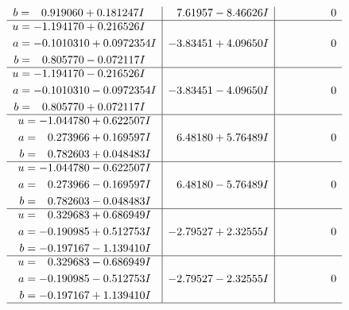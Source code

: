 \documentclass[1p]{elsarticle_modified}
\theoremstyle{definition}
\begin{document}
$$\begin{array}{c|c|c}
\begin{aligned}
b &= \phantom{-}0.919060 + 0.181247 I\end{aligned}
 & \phantom{-}7.61957 - 8.46626 I & \phantom{-0.000000 } 0 \\ \hline\begin{aligned}
u &= -1.194170 + 0.216526 I \\
a &= -0.1010310 + 0.0972354 I \\
b &= \phantom{-}0.805770 - 0.072117 I\end{aligned}
 & -3.83451 + 4.09650 I & \phantom{-0.000000 } 0 \\ \hline\begin{aligned}
u &= -1.194170 - 0.216526 I \\
a &= -0.1010310 - 0.0972354 I \\
b &= \phantom{-}0.805770 + 0.072117 I\end{aligned}
 & -3.83451 - 4.09650 I & \phantom{-0.000000 } 0 \\ \hline\begin{aligned}
u &= -1.044780 + 0.622507 I \\
a &= \phantom{-}0.273966 + 0.169597 I \\
b &= \phantom{-}0.782603 + 0.048483 I\end{aligned}
 & \phantom{-}6.48180 + 5.76489 I & \phantom{-0.000000 } 0 \\ \hline\begin{aligned}
u &= -1.044780 - 0.622507 I \\
a &= \phantom{-}0.273966 - 0.169597 I \\
b &= \phantom{-}0.782603 - 0.048483 I\end{aligned}
 & \phantom{-}6.48180 - 5.76489 I & \phantom{-0.000000 } 0 \\ \hline\begin{aligned}
u &= \phantom{-}0.329683 + 0.686949 I \\
a &= -0.190985 + 0.512753 I \\
b &= -0.197167 - 1.139410 I\end{aligned}
 & -2.79527 + 2.32555 I & \phantom{-0.000000 } 0 \\ \hline\begin{aligned}
u &= \phantom{-}0.329683 - 0.686949 I \\
a &= -0.190985 - 0.512753 I \\
b &= -0.197167 + 1.139410 I\end{aligned}
 & -2.79527 - 2.32555 I & \phantom{-0.000000 } 0\\
 \hline 
 \end{array}$$\newpage$$\begin{array}{c|c|c}  

\end{array}$$
\end{document}
